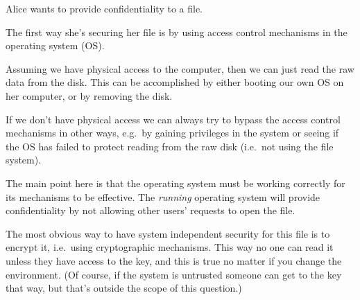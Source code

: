 \question[3]
  Alice wants to provide confidentiality to a file.

  \begin{solution}
    The first way she's securing her file is by using access control mechanisms 
    in the operating system (OS).

    Assuming we have physical access to the computer, then we can just read the 
    raw data from the disk.
    This can be accomplished by either booting our own OS on her computer, or 
    by removing the disk.

    If we don't have physical access we can always try to bypass the access 
    control mechanisms in other ways, e.g.\ by gaining privileges in the system 
    or seeing if the OS has failed to protect reading from the raw disk (i.e.\ 
    not using the file system).

    The main point here is that the operating system must be working correctly 
    for its mechanisms to be effective.
    The \emph{running} operating system will provide confidentiality by not 
    allowing other users' requests to open the file.

    The most obvious way to have system independent security for this file is 
    to encrypt it, i.e.~using cryptographic mechanisms.
    This way no one can read it unless they have access to the key, and this is 
    true no matter if you change the environment.
    (Of course, if the system is untrusted someone can get to the key that way, 
    but that's outside the scope of this question.)
  \end{solution}


